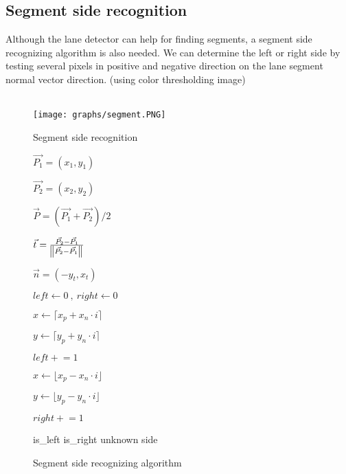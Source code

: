 \documentclass{article}
\begin{document}
\subsection{Segment side recognition}

Although the lane detector can help for finding segments, a segment side recognizing algorithm is also needed. We can determine the left or right side by testing several pixels in positive and negative direction on the lane segment normal vector direction. (using color thresholding image)
\\
\\

\begin{figure}[ht]
  \label{fig:lane_segment}
  \centering
  \texttt{[image: graphs/segment.PNG]}
  \caption{Segment side recognition}
\end{figure}
\FloatBarrier

\begin{figure} [ht]
\begin{algorithm}[H]
	$\vec{P_1} = (x_1, y_1)$

	$\vec{P_2} = (x_2, y_2)$

	$\vec{P} = (\vec{P_1} + \vec{P_2}) / 2$

	$\vec{t} = \frac{\vec{P_2} - \vec{P_1}}
					{\norm{\vec{P_2} - \vec{P_1}}}$

	$\vec{n} = (-y_t, x_t)$

	$left \gets 0 \ , \ right \gets 0$

	 {
		$x \gets \lceil x_p + x_n \cdot i \rceil$

		$y \gets \lceil y_p + y_n \cdot i \rceil$
	
			{
				$left \mathrel{+}= 1$ 
			}
			
		$x \gets \lfloor x_p - x_n \cdot i \rfloor$

		$y \gets \lfloor y_p - y_n \cdot i \rfloor$
		
			{
				$right \mathrel{+}= 1$ 
			}
	}
	
		{
			\Return is\_left
		}
		{
			\Return is\_right
		}
	\uElse
		{
			\Return unknown side
		} 
	\caption{Segment side recognizing algorithm}
\end{algorithm}
\end{figure}
\FloatBarrier
\end{document}
